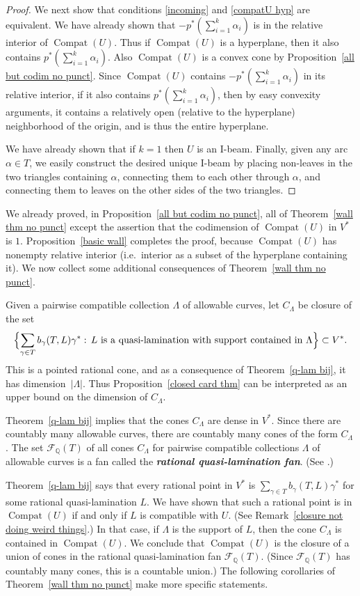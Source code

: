 \documentclass{amsart}
\theoremstyle{definition}
\theoremstyle{remark}
\numberwithin{equation}{section}
\newcommand{\newword}[1]{\textbf{\emph{#1}}}
\newcommand{\rationals}{\mathbb Q}
\newcommand{\settt}[1]{{\Bigl\lbrace #1 \Bigr\rbrace}}
\newcommand{\F}{{\mathcal F}}
\newcommand{\0}{{\mathbf{0}}}
\newcommand{\Compat}{\operatorname{Compat}}
\begin{document}
\begin{proof}
We next show that conditions \eqref{incoming} and \eqref{compatU hyp} are equivalent.
We have already shown that $-p^*(\sum_{i=1}^k\alpha_i)$ is in the relative interior of $\Compat(U)$.
Thus if $\Compat(U)$ is a hyperplane, then it also contains $p^*(\sum_{i=1}^k\alpha_i)$.
Also $\Compat(U)$ is a convex cone by Proposition~\ref{all but codim no punct}.
Since $\Compat(U)$ contains $-p^*(\sum_{i=1}^k\alpha_i)$ in its relative interior, if it also contains $p^*(\sum_{i=1}^k\alpha_i)$, then by easy convexity arguments, it contains a relatively open (relative to the hyperplane) neighborhood of the origin, and is thus the entire hyperplane.

We have already shown that if $k=1$ then $U$ is an I-beam.
Finally, given any arc $\alpha\in T$, we easily construct the desired unique I-beam by placing non-leaves in the two triangles containing $\alpha$, connecting them to each other through $\alpha$, and connecting them to leaves on the other sides of the two triangles.
\end{proof}

We already proved, in Proposition~\ref{all but codim no punct}, all of Theorem~\ref{wall thm no punct} except the assertion that the codimension of $\Compat(U)$ in $V^*$ is $1$.
Proposition~\ref{basic wall} completes the proof, because $\Compat(U)$ has nonempty relative interior (i.e.\ interior as a subset of the hyperplane containing it).
We now collect some additional consequences of Theorem~\ref{wall thm no punct}.

Given a pairwise compatible collection $\Lambda$ of allowable curves, let $C_\Lambda$ be closure of the set
\[\settt{\sum_{\gamma\in T}b_\gamma(T,L)\gamma^*:\,L\text{ is a quasi-lamination with support contained in }\Lambda}\subset V^*.\]
This is a pointed rational cone, and as a consequence of Theorem~\ref{q-lam bij}, it has dimension~$|\Lambda|$.
Thus Proposition~\ref{closed card thm} can be interpreted as an upper bound on the dimension of $C_\Lambda$.

Theorem~\ref{q-lam bij} implies that the cones $C_\Lambda$ are dense in $V^*$.
Since there are countably many allowable curves, there are countably many cones of the form $C_\Lambda$.
The set $\F_\rationals(T)$ of all cones $C_\Lambda$ for pairwise compatible collections $\Lambda$ of allowable curves is a fan called the \newword{rational quasi-lamination fan}.
(See \cite[Section~4]{unisurface}.)

Theorem~\ref{q-lam bij} says that every rational point in $V^*$ is $\sum_{\gamma\in T}b_\gamma(T,L)\gamma^*$ for some rational quasi-lamination $L$.
We have shown that such a rational point is in $\Compat(U)$ if and only if $L$ is compatible with $U$.
(See Remark~\ref{closure not doing weird things}.)
In that case, if $\Lambda$ is the support of $L$, then the cone $C_\Lambda$ is contained in $\Compat(U)$.
We conclude that $\Compat(U)$ is the closure of a union of cones in the rational quasi-lamination fan $\F_\rationals(T)$.
(Since $\F_\rationals(T)$ has countably many cones, this is a countable union.)
The following corollaries of Theorem~\ref{wall thm no punct} make more specific statements.
\end{document}
